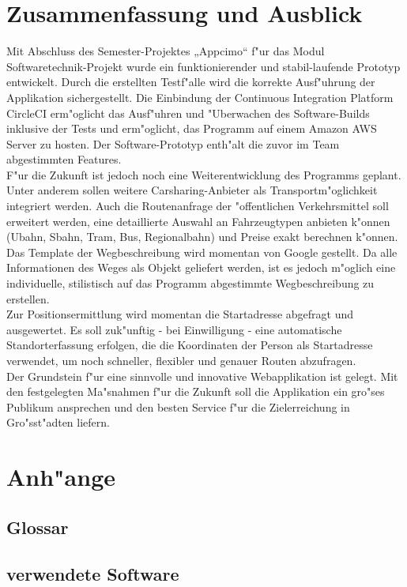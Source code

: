 \documentclass[a4paper, 11pt]{scrreprt}
\begin{document}
\chapter{Zusammenfassung und Ausblick}
Mit Abschluss des Semester-Projektes „Appcimo“ f"ur das Modul Softwaretechnik-Projekt wurde ein funktionierender und stabil-laufende Prototyp entwickelt. Durch die erstellten Testf"alle wird die korrekte Ausf"uhrung der Applikation sichergestellt. Die Einbindung der Continuous Integration Platform CircleCI erm"oglicht das Ausf"uhren und "Uberwachen des Software-Builds inklusive der Tests und erm"oglicht, das Programm auf einem Amazon AWS Server zu hosten. Der Software-Prototyp enth"alt die zuvor im Team abgestimmten Features.\\
F"ur die Zukunft ist jedoch noch eine Weiterentwicklung des Programms geplant. Unter anderem sollen weitere Carsharing-Anbieter als Transportm"oglichkeit integriert werden. Auch die Routenanfrage der "offentlichen Verkehrsmittel soll erweitert werden, eine detaillierte Auswahl an Fahrzeugtypen anbieten k"onnen (Ubahn, Sbahn, Tram, Bus, Regionalbahn) und Preise exakt berechnen k"onnen. \\

Das Template der Wegbeschreibung wird momentan von Google gestellt. Da alle Informationen des Weges als Objekt geliefert werden, ist es jedoch m"oglich eine individuelle, stilistisch auf das Programm abgestimmte Wegbeschreibung zu erstellen. \\

Zur Positionsermittlung wird momentan die Startadresse abgefragt und ausgewertet. Es soll zuk"unftig - bei Einwilligung - eine automatische Standorterfassung erfolgen, die die Koordinaten der Person als Startadresse verwendet, um noch schneller, flexibler und genauer Routen abzufragen.\\

Der Grundstein f"ur eine sinnvolle und innovative Webapplikation ist gelegt. Mit den festgelegten Ma"snahmen f"ur die Zukunft soll die Applikation ein gro"ses Publikum ansprechen und den besten Service f"ur die Zielerreichung in Gro"sst"adten liefern.\\


\chapter{Anh"ange}

\section{Glossar}

\section{verwendete Software}
\end{document}
